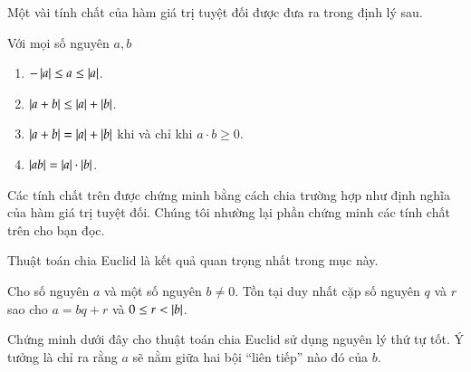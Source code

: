 Một vài tính chất của hàm giá trị tuyệt đối được đưa ra trong định lý sau.
\begin{theorem}
    Với mọi số nguyên $a, b$
    \begin{enumerate}[label={(\roman*)}]
        \item $-\left\vert{a}\right\vert\leq a \leq \left\vert{a}\right\vert$.
        \item $\left\vert{a + b}\right\vert\leq \left\vert{a}\right\vert + \left\vert{b}\right\vert$.
        \item $\left\vert{a + b}\right\vert = \left\vert{a}\right\vert + \left\vert{b}\right\vert$ khi và chỉ khi $a\cdot b\geq 0$.
        \item $\left\vert{ab}\right\vert = \left\vert{a}\right\vert\cdot\left\vert{b}\right\vert$.
    \end{enumerate}
\end{theorem}

Các tính chất trên được chứng minh bằng cách chia trường hợp như định nghĩa của hàm giá trị tuyệt đối. Chúng tôi nhường lại phần chứng minh các tính chất trên cho bạn đọc.

Thuật toán chia Euclid là kết quả quan trọng nhất trong mục này.
\begin{theorem}
    Cho số nguyên $a$ và một số nguyên $b\ne 0$. Tồn tại duy nhất cặp số nguyên $q$ và $r$ sao cho $a = bq + r$ và $0\leq r < \left\vert{b}\right\vert$.
\end{theorem}

Chứng minh dưới đây cho thuật toán chia Euclid sử dụng nguyên lý thứ tự tốt. Ý tưởng là chỉ ra rằng $a$ sẽ nằm giữa hai bội ``liên tiếp'' nào đó của $b$.

